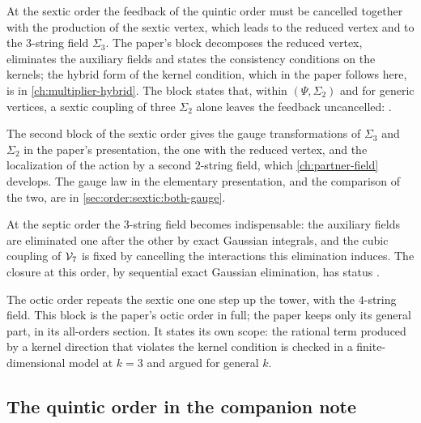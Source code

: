 

At the sextic order the feedback of the quintic order must be cancelled together with the production of the sextic vertex, which leads to the reduced vertex and to the $3$-string field $\Sigma_3$.
The paper's block decomposes the reduced vertex, eliminates the auxiliary fields and states the consistency conditions on the kernels; the hybrid form of the kernel condition, which in the paper follows here, is in \cref{ch:multiplier-hybrid}.
The block states that, within $(\Psi, \Sigma_2)$ and for generic vertices, a sextic coupling of three $\Sigma_2$ alone leaves the feedback uncancelled: .



The second block of the sextic order gives the gauge transformations of $\Sigma_3$ and $\Sigma_2$ in the paper's presentation, the one with the reduced vertex, and the localization of the action by a second $2$-string field, which \cref{ch:partner-field} develops.
The gauge law in the elementary presentation, and the comparison of the two, are in \cref{sec:order:sextic:both-gauge}.



At the septic order the $3$-string field becomes indispensable: the auxiliary fields are eliminated one after the other by exact Gaussian integrals, and the cubic coupling of $\mathcal{V}_{7}$ is fixed by cancelling the interactions this elimination induces.
The closure at this order, by sequential exact Gaussian elimination, has status .



The octic order repeats the sextic one one step up the tower, with the $4$-string field.
This block is the paper's octic order in full; the paper keeps only its general part, in its all-orders section.
It states its own scope: the rational term produced by a kernel direction that violates the kernel condition is checked in a finite-dimensional model at $k = 3$ and argued for general $k$.



\subsection{The quintic order in the companion note}
\label{sec:order:companion-quintic}

